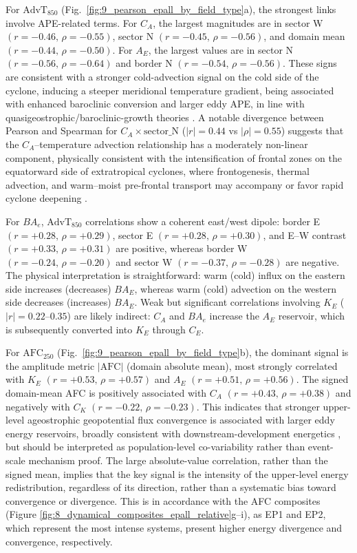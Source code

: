 \documentclass[pdflatex,sn-chicago]{sn-jnl}%
\theoremstyle{plain}
\theoremstyle{definition}
\theoremstyle{remark}
\theoremstyle{definition}
\begin{document}
For $\mathrm{AdvT}_{850}$ (Fig.~\ref{fig:9_pearson_epall_by_field_type}a), the strongest links involve APE-related terms. For $C_A$, the largest magnitudes are in sector W $(r=-0.46,\,\rho=-0.55)$, sector N $(r=-0.45,\,\rho=-0.56)$, and domain mean $(r=-0.44,\,\rho=-0.50)$. For $A_E$, the largest values are in sector N $(r=-0.56,\,\rho=-0.64)$ and border N $(r=-0.54,\,\rho=-0.56)$. These signs are consistent with a stronger cold-advection signal on the cold side of the cyclone, inducing a steeper meridional temperature gradient, being associated with enhanced baroclinic conversion and larger eddy APE, in line with quasigeostrophic/baroclinic-growth theories \citep{lorenz1955available,davies2015quasigeostrophic}. A notable divergence between Pearson and Spearman for $C_A \times \mathrm{sector\_N}$ ($|r| = 0.44$ vs $|\rho| = 0.55$) suggests that the $C_A$–temperature advection relationship has a moderately non-linear component, physically consistent with the intensification of frontal zones on the equatorward side of extratropical cyclones, where frontogenesis, thermal advection, and warm--moist pre-frontal transport may accompany or favor rapid cyclone deepening \citep{dacre2025kinematic}.

For $BA_e$, $\mathrm{AdvT}_{850}$ correlations show a coherent east/west dipole: border E $(r=+0.28,\,\rho=+0.29)$, sector E $(r=+0.28,\,\rho=+0.30)$, and E--W contrast $(r=+0.33,\,\rho=+0.31)$ are positive, whereas border W $(r=-0.24,\,\rho=-0.20)$ and sector W $(r=-0.37,\,\rho=-0.28)$ are negative. The physical interpretation is straightforward: warm (cold) influx on the eastern side increases (decreases) $BA_E$, whereas warm (cold) advection on the western side decreases (increases) $BA_E$. Weak but significant correlations involving $K_E$ ($|r| = 0.22$–$0.35$) are likely indirect: $C_A$ and $BA_e$ increase the $A_E$ reservoir, which is subsequently converted into $K_E$ through $C_E$.


For $\mathrm{AFC}_{250}$ (Fig.~\ref{fig:9_pearson_epall_by_field_type}b), the dominant signal is the amplitude metric $|\mathrm{AFC}|$ (domain absolute mean), most strongly correlated with $K_E$ $(r=+0.53,\,\rho=+0.57)$ and $A_E$ $(r=+0.51,\,\rho=+0.56)$. The signed domain-mean AFC is positively associated with $C_A$ $(r=+0.43,\,\rho=+0.38)$ and negatively with $C_K$ $(r=-0.22,\,\rho=-0.23)$. This indicates that stronger upper-level ageostrophic geopotential flux convergence is associated with larger eddy energy reservoirs, broadly consistent with downstream-development energetics \citep{orlanski1991life,orlanski1993ageostrophic}, but should be interpreted as population-level co-variability rather than event-scale mechanism proof. The large absolute-value correlation, rather than the signed mean, implies that the key signal is the intensity of the upper-level energy redistribution, regardless of its direction, rather than a systematic bias toward convergence or divergence. This is in accordance with the AFC composites (Figure \ref{fig:8_dynamical_composites_epall_relative}g--i), as EP1 and EP2, which represent the most intense systems, present higher energy divergence and convergence, respectively.
\end{document}
